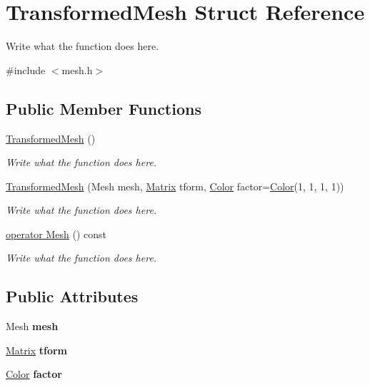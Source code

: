 \hypertarget{structTransformedMesh}{\section{Transformed\+Mesh Struct Reference}
\label{structTransformedMesh}
}


Write what the function does here.  




{\ttfamily \#include $<$mesh.\+h$>$}

\subsection*{Public Member Functions}
\begin{DoxyCompactItemize}
\item 
\hyperlink{structTransformedMesh_ae6fc1fe9eb6e7f34a9bf9a279206761e}{Transformed\+Mesh} ()
\begin{DoxyCompactList}\small\item\em Write what the function does here. \end{DoxyCompactList}\item 
\hyperlink{structTransformedMesh_a845e75bfa1617afc8bc6e7e75429fe48}{Transformed\+Mesh} (Mesh mesh, \hyperlink{classMatrix}{Matrix} tform, \hyperlink{structColor}{Color} factor=\hyperlink{structColor}{Color}(1, 1, 1, 1))
\begin{DoxyCompactList}\small\item\em Write what the function does here. \end{DoxyCompactList}\item 
\hyperlink{structTransformedMesh_ab2294d4ace15f6fbcae200d09f5d6910}{operator Mesh} () const 
\begin{DoxyCompactList}\small\item\em Write what the function does here. \end{DoxyCompactList}\end{DoxyCompactItemize}
\subsection*{Public Attributes}
\begin{DoxyCompactItemize}
\item 
\hypertarget{structTransformedMesh_a94d242137b194041a3028e07317d0d8c}{Mesh {\bfseries mesh}}\label{structTransformedMesh_a94d242137b194041a3028e07317d0d8c}

\item 
\hypertarget{structTransformedMesh_a5a1639367ab17697e8245105d18088ad}{\hyperlink{classMatrix}{Matrix} {\bfseries tform}}\label{structTransformedMesh_a5a1639367ab17697e8245105d18088ad}

\item 
\hypertarget{structTransformedMesh_a4b9116e548cf96c33298b72ffb7a76c9}{\hyperlink{structColor}{Color} {\bfseries factor}}\label{structTransformedMesh_a4b9116e548cf96c33298b72ffb7a76c9}

\end{DoxyCompactItemize}


